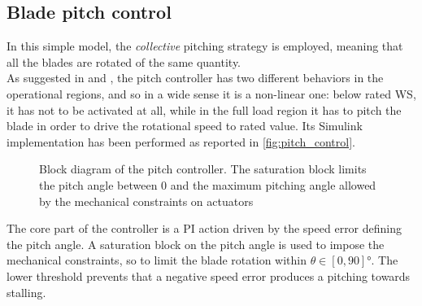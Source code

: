                         

\subsection{Blade pitch control}

In this simple model, the \textit{collective} pitching strategy is employed, meaning that all the blades are rotated of the same quantity.\\
As suggested in \cite{Aerodynamics_of_wind_turbines} and \cite{SMILDEN2016386}, the pitch controller has two different behaviors in the operational regions, and so in a wide sense it is a non-linear one: below rated \acrshort{WS}, it has not to be activated at all, while in the full load region it has to pitch the blade in order to drive the rotational speed to rated value. Its Simulink implementation has been performed as reported in \autoref{fig:pitch_control}.
\begin{figure}[H]
    \centering
    
    \caption{Block diagram of the pitch controller. The saturation block limits the pitch angle between 0 and the maximum pitching angle allowed by the mechanical constraints on actuators}
    \label{fig:pitch_control}
\end{figure}

The core part of the controller is a \acrfull{PI} action driven by the speed error defining the pitch angle. A saturation block on the pitch angle is used to impose the mechanical constraints, so to limit the blade rotation within $\theta \in \left[0, 90\right] \si{\degree}$. The lower threshold prevents that a negative speed error produces a pitching towards stalling.

